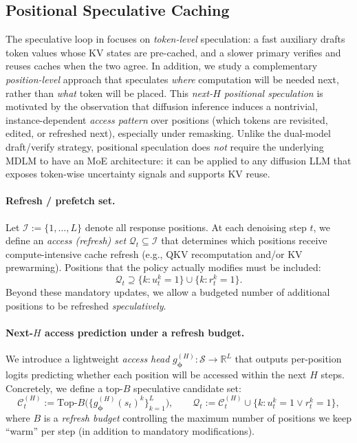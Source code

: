 \documentclass[11pt]{article}
\newcommand{\R}{\mathbb{R}}
\newcommand{\cS}{\mathcal{S}}
\newcommand{\cQ}{\mathcal{Q}}
\newcommand{\cC}{\mathcal{C}}
\newcommand{\cI}{\mathcal{I}}
\newcommand{\bphi}{\bm{\phi}}
\begin{document}
\subsection{Positional Speculative Caching}
\label{sec:positional_spec_cache}

The speculative loop in  focuses on \emph{token-level} speculation: a fast auxiliary drafts token values whose KV states are pre-cached, and a slower primary verifies and reuses caches when the two agree.
In addition, we study a complementary \emph{position-level} approach that speculates \emph{where} computation will be needed next, rather than \emph{what} token will be placed.
This \emph{next-$H$ positional speculation} is motivated by the observation that diffusion inference induces a nontrivial, instance-dependent \emph{access pattern} over positions (which tokens are revisited, edited, or refreshed next), especially under remasking.
Unlike the dual-model draft/verify strategy, positional speculation does \emph{not} require the underlying MDLM to have an MoE architecture: it can be applied to any diffusion LLM that exposes token-wise uncertainty signals and supports KV reuse.

\paragraph{Refresh / prefetch set.}
Let $\cI := \{1,\dots,L\}$ denote all response positions.
At each denoising step $t$, we define an \emph{access (refresh) set} $\cQ_t \subseteq \cI$ that determines which positions receive compute-intensive cache refresh (e.g., QKV recomputation and/or KV prewarming).
Positions that the policy actually modifies must be included:
\begin{equation}
    \cQ_t \supseteq \{k : u_t^k = 1\} \cup \{k : r_t^k = 1\}.
    \label{eq:Qt_mandatory}
\end{equation}
Beyond these mandatory updates, we allow a budgeted number of additional positions to be refreshed \emph{speculatively}.

\paragraph{Next-$H$ access prediction under a refresh budget.}
We introduce a lightweight \emph{access head} $g_{\bphi}^{(H)}:\cS \to \R^L$ that outputs per-position logits predicting whether each position will be accessed within the next $H$ steps.
Concretely, we define a top-$B$ speculative candidate set:
\begin{equation}
    \cC_t^{(H)} := \text{Top-}B\bigl(\{g_{\bphi}^{(H)}(s_t)^k\}_{k=1}^L\bigr),
    \qquad
    \cQ_t := \cC_t^{(H)} \cup \{k : u_t^k = 1 \lor r_t^k = 1\},
    \label{eq:Qt_candidates}
\end{equation}
where $B$ is a \emph{refresh budget} controlling the maximum number of positions we keep ``warm'' per step (in addition to mandatory modifications).
\end{document}
